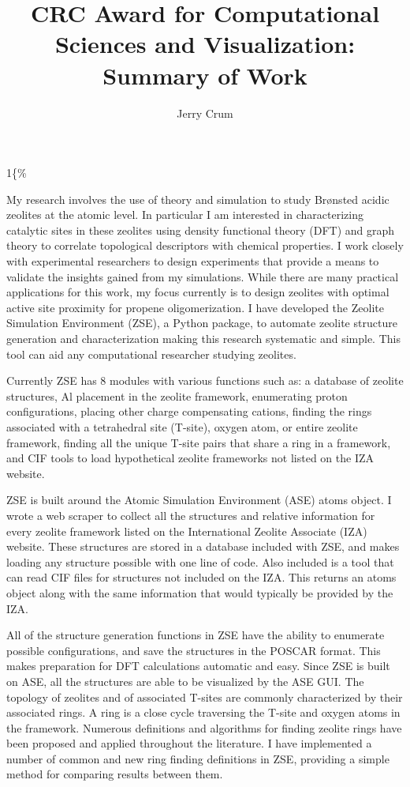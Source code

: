 \documentclass[11pt]{article}
\author{Jerry Crum}
\date{}
\title{CRC Award for Computational Sciences and Visualization: Summary of Work}
\begin{document}
\begin{OPTIONS}
\def\udesoftecoverride\#1\mainmatter\{\%
  \AfterEndPreamble{#1\mainmatter}
\end{OPTIONS}

\maketitle
\Sectionnumbersoff

My research involves the use of theory and simulation to study Br\o nsted acidic zeolites at the atomic level. In particular I am interested in characterizing catalytic sites in these zeolites using density functional theory (DFT) and graph theory to correlate topological descriptors with chemical properties. I work closely with experimental researchers to design experiments that provide a means to validate the insights gained from my simulations. While there are many practical applications for this work, my focus currently is to design zeolites with optimal active site proximity for propene oligomerization. I have developed the Zeolite Simulation Environment (ZSE), a Python package, to automate zeolite structure generation and characterization making this research systematic and simple. This tool can aid any computational researcher studying zeolites. 

Currently ZSE has 8 modules with various functions such as: a database of zeolite structures, Al placement in the zeolite framework, enumerating proton configurations, placing other charge compensating cations, finding the rings associated with a tetrahedral site (T-site), oxygen atom, or entire zeolite framework, finding all the unique T-site pairs that share a ring in a framework, and CIF tools to load hypothetical zeolite frameworks not listed on the IZA website. 

ZSE is built around the Atomic Simulation Environment (ASE) atoms object. \cite{ase-ask} I wrote a web scraper to collect all the structures and relative information for every zeolite framework listed on the International Zeolite Associate (IZA) website. \cite{baerlocher}  These structures are stored in a database included with ZSE, and makes loading any structure possible with one line of code. Also included is a tool that can read CIF files for structures not included on the IZA. This returns an atoms object along with the same information that would typically be provided by the IZA. 

All of the structure generation functions in ZSE have the ability to enumerate possible configurations, and save the structures in the POSCAR format. This makes preparation for DFT calculations automatic and easy. Since ZSE is built on ASE, all the structures are able to be visualized by the ASE GUI. The topology of zeolites and of associated T-sites are commonly characterized by their associated rings. A ring is a close cycle traversing the T-site and oxygen atoms in the framework. Numerous definitions and algorithms for finding zeolite rings have been proposed and applied throughout the literature. I have implemented a number of common and new ring finding definitions in ZSE, providing a simple method for comparing results between them. 
\end{document}
